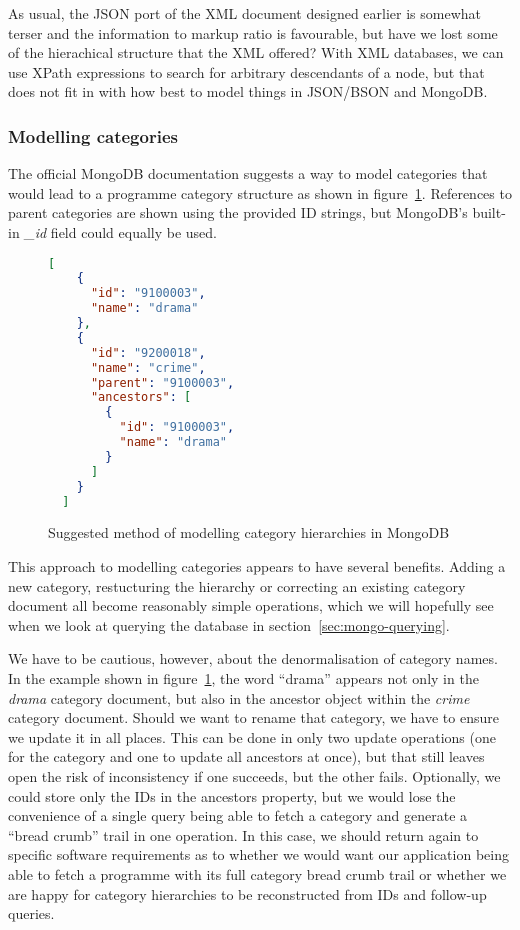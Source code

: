\documentclass[11pt,a4paper]{article}
\begin{document}
As usual, the JSON port of the XML document designed earlier is somewhat
terser and the information to markup ratio is favourable, but have we
lost some of the hierachical structure that the XML offered? With
XML databases, we can use XPath expressions to search for arbitrary
descendants of a node, but that does not fit in with how best
to model things in JSON/BSON and MongoDB.

\subsubsection{Modelling categories}
\label{sec:mongo-design-categories}

The official MongoDB documentation\cite{mongo-categories} suggests
a way to model categories that would lead to a programme category
structure as shown in figure~\ref{fig:json-categories}. References
to parent categories are shown using the provided ID strings, but
MongoDB's built-in \emph{\_id} field could equally be used.

\begin{figure}[p]
\begin{lstlisting}[language=json]
  [
    {
      "id": "9100003",
      "name": "drama"
    },
    {
      "id": "9200018",
      "name": "crime",
      "parent": "9100003",
      "ancestors": [
        {
          "id": "9100003",
          "name": "drama"
        }
      ]
    }
  ]
\end{lstlisting}
  \caption{Suggested method of modelling category hierarchies in MongoDB}
  \label{fig:json-categories}
\end{figure}

This approach to modelling categories appears to have several benefits.
Adding a new category, restucturing the hierarchy or correcting an
existing category document all become reasonably simple operations, which
we will hopefully see when we look at querying the database in
section~\ref{sec:mongo-querying}.

We have to be cautious, however, about the denormalisation of category
names. In the example shown in figure~\ref{fig:json-categories}, the
word ``drama'' appears not only in the \emph{drama} category document, but
also in the ancestor object within the \emph{crime} category document.
Should we want to rename that category, we have to ensure we update it
in all places. This can be done in only two update operations (one
for the category and one to update all ancestors at once), but
that still leaves open the risk of inconsistency if one succeeds, but
the other fails. Optionally, we could store only the IDs in the
ancestors property, but we would lose the convenience of a single
query being able to fetch a category and generate a ``bread crumb''
trail in one operation. In this case, we should return again
to specific software requirements as to whether we would want
our application being able to fetch a programme with its full category
bread crumb trail or whether we are happy for category hierarchies to
be reconstructed from IDs and follow-up queries.
\end{document}
